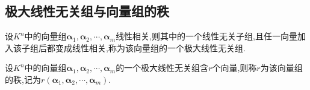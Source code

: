 \documentclass{ctexart}
\begin{document}
\subsection{极大线性无关组与向量组的秩}
\begin{definition}[极大线性无关组]
    设$K^n$中的向量组$\boldsymbol{\alpha}_1,\boldsymbol{\alpha}_2,\cdots,\boldsymbol{\alpha}_m$线性相关,则其中的一个线性无关子组,且任一向量加入该子组后都变成线性相关,称为该向量组的一个极大线性无关组.
\end{definition}
\begin{definition}[秩]
    设$K^n$中的向量组$\boldsymbol{\alpha}_1,\boldsymbol{\alpha}_2,\cdots,\boldsymbol{\alpha}_m$的一个极大线性无关组含$r$个向量,则称$r$为该向量组的秩,记为$r(\boldsymbol{\alpha}_1,\boldsymbol{\alpha}_2,\cdots,\boldsymbol{\alpha}_m)$.
\end{definition}
\end{document}
